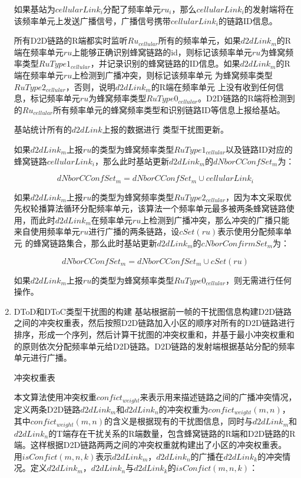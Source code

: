 \documentclass[figurelist,tablelist,algorithmlist,nomlist,masters]{seuthesix}
\begin{document}
\begin{enumerate}
	如果基站为$cellularLin{k_i}$分配了频率单元$r{u_i}$，那么$cellularLin{k_i}$的发射端将在该频率单元上发送广播信号，广播信号携带$cellularLin{k_i}$的链路ID信息。
	
	所有D2D链路的R端都实时监听$R{u_{cellular}}$所有的频率单元，如果$d2dLin{k_m}$的R端在频率单元$ru$上能够正确识别蜂窝链路的id，则标记该频率单元$ru$为蜂窝频率类型$RuType{1_{cellular}}$，并记录识别的蜂窝链路的ID信息。如果$d2dLin{k_m}$的R端在频率单元$ru$上检测到广播冲突，则标记该频率单元 为蜂窝频率类型$RuType{2_{cellular}}$，否则，说明$d2dLin{k_m}$的R端在频率单元 上没有收到任何信息，标记频率单元$ru$为蜂窝频率类型$RuType{0_{cellular}}$。D2D链路的R端将检测到的$R{u_{cellular}}$所有频率单元的蜂窝频率类型和识别链路ID等信息上报给基站。
	
	基站统计所有的$d2dLink$上报的数据进行 类型干扰图更新。
	
	如果$d2dLin{k_m}$上报$ru$的类型为蜂窝频率类型$RuType{1_{cellular}}$以及链路ID对应的蜂窝链路$cellularLin{k_i}$，那么此时基站更新$d2dLin{k_m}$的$dNborCConfSe{t_m}$为：
	
	
	\begin{equation}\label{eq2.1}
	dNborCConfSe{t_m} = dNborCConfSe{t_m} \cup cellularLin{k_i}
	\end{equation}
	
	如果$d2dLin{k_m}$上报$ru$的类型为蜂窝频率类型$RuType{2_{cellular}}$，因为本文采取优先权轮播算法循环分配频率单元，该算法一个频率单元最多被两条蜂窝链路使用，而此时$d2dLin{k_m}$在频率单元$ru$上检测到广播冲突，那么冲突的广播只能来自使用频率单元$ru$进行广播的两条链路，设$cSet(ru)$表示使用分配频率单元 的蜂窝链路集合，那么此时基站更新$d2dLin{k_m}$的$cNborConfirmSe{t_m}$为：
	
	\begin{equation}\label{eq2.1}
	dNborCConfSe{t_m} = dNborCConfSe{t_m} \cup cSet(ru)
	\end{equation}
	
	如果$d2dLin{k_m}$上报$ru$的类型为蜂窝频率类型$RuType{0_{cellular}}$，则无需进行任何操作。
	
	\item DToD和DToC类型干扰图的构建
	基站根据前一帧的干扰图信息构建D2D链路之间的冲突权重表，然后按照D2D链路加入小区的顺序对所有的D2D链路进行排序，形成一个序列，然后计算干扰图的冲突权重和，并基于最小冲突权重和的原则依次分配频率单元给D2D链路。D2D链路的发射端根据基站分配的频率单元进行广播。
	
	冲突权重表
	
	本文算法使用冲突权重$confic{t_{weight}}$来表示用来描述链路之间的广播冲突情况，定义两条D2D链路$d2dLin{k_m}$和$d2dLin{k_n}$的冲突权重为$confic{t_{weight}}(m,n)$，其中$confic{t_{weight}}(m,n)$的含义是根据现有的干扰图信息，同时与$d2dLin{k_m}$和$d2dLin{k_n}$的T端存在干扰关系的R端数量，包含蜂窝链路的R端和D2D链路的R端。这样根据D2D链路两两之间的冲突权重就构建出了小区的冲突权重表。
	用$isConfict(m,n,k)$表示$d2dLin{k_m}$，$d2dLin{k_n}$的广播在$d2dLin{k_k}$的冲突情况。定义$d2dLin{k_m}$，$d2dLin{k_n}$与$d2dLin{k_k}$的$isConfict(m,n,k)$：
	

\end{enumerate}
\end{document}
